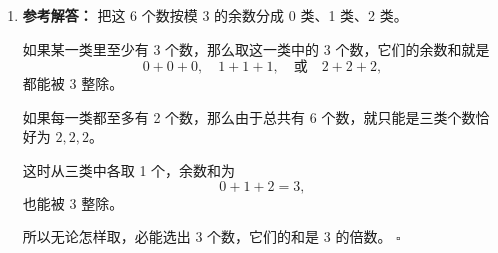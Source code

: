 \documentclass[11pt,a4paper,fontset=fandol]{ctexart}
\newenvironment{solution}{\par\noindent\textbf{参考解答：}}{\hfill$\square$\par}
\begin{document}
\begin{enumerate}
\begin{solution}
  但 14 不是 3 的倍数，所以不可能把两堆石子恰好全部取完。
  \end{solution}

  \item \begin{solution}
  把这 6 个数按模 $3$ 的余数分成 0 类、1 类、2 类。

  如果某一类里至少有 3 个数，那么取这一类中的 3 个数，它们的余数和就是
  \[
  0+0+0,\quad 1+1+1,\quad \text{或}\quad 2+2+2,
  \]
  都能被 $3$ 整除。

  如果每一类都至多有 2 个数，那么由于总共有 6 个数，就只能是三类个数恰好为 $2,2,2$。

  这时从三类中各取 1 个，余数和为
  \[
  0+1+2=3,
  \]
  也能被 $3$ 整除。

  所以无论怎样取，必能选出 3 个数，它们的和是 3 的倍数。
  \end{solution}
\end{enumerate}
\end{document}
